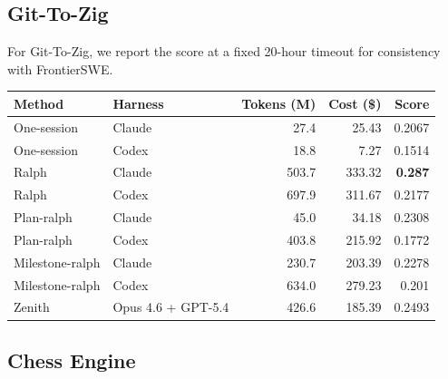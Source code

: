 \documentclass[11pt,a4paper]{article}
\newcommand{\code}[1]{#1}
\begin{document}
\subsection*{Git-To-Zig}

For Git-To-Zig, we report the score at a fixed 20-hour timeout for consistency with FrontierSWE.

\noindent\begin{tabular}{@{}llrrr@{}}
\toprule
\rowcolor{tablehead}\textbf{\color{white}Method} & \textbf{\color{white}Harness} & \textbf{\color{white}Tokens (M)} & \textbf{\color{white}Cost (\$)} & \textbf{\color{white}Score} \\
\midrule
\code{One-session}    & Claude              & 27.4   & 25.43   & 0.2067 \\
\rowcolor{tableband}
\code{One-session}    & Codex               & 18.8   & 7.27    & 0.1514 \\
\code{Ralph}          & Claude              & 503.7  & 333.32  & \textbf{0.287} \\
\rowcolor{tableband}
\code{Ralph}          & Codex               & 697.9  & 311.67  & 0.2177 \\
\code{Plan-ralph}     & Claude              & 45.0   & 34.18   & 0.2308 \\
\rowcolor{tableband}
\code{Plan-ralph}     & Codex               & 403.8  & 215.92  & 0.1772 \\
\code{Milestone-ralph}& Claude              & 230.7  & 203.39  & 0.2278 \\
\rowcolor{tableband}
\code{Milestone-ralph}& Codex               & 634.0  & 279.23  & 0.201 \\
\code{Zenith}         & Opus 4.6 + GPT-5.4  & 426.6  & 185.39  & 0.2493 \\
\bottomrule
\end{tabular}

\subsection*{Chess Engine}
\end{document}
